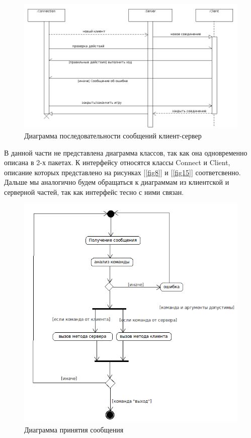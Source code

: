 \begin{figure}[ht]
\centering
\includegraphics[width=16cm]{images/par.png}
\caption{Диаграмма последовательности сообщений клиент-сервер}
\label{fig4}
\end{figure}

В данной части не представлена диаграмма классов, так как она одновременно описана в 2-х пакетах. К интерфейсу относятся классы Connect и Client, описание которых представлено на рисунках [\ref{fig8}] и [\ref{fig15}] соответсвенно. Дальше мы аналогично будем обращаться к диаграммам из клиентской и серверной частей, так как интерфейс тесно с ними связан.

\begin{figure}[ht]
\centering
\includegraphics[width=12cm]{images/activity.png}
\caption{Диаграмма принятия сообщения}
\label{fig5}
\end{figure}

